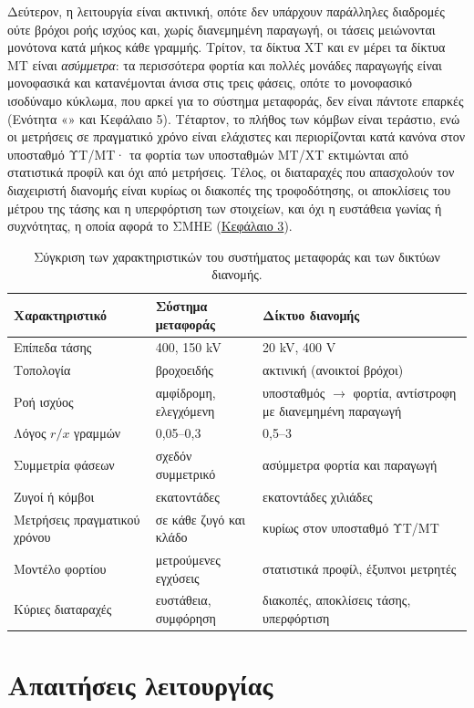 Δεύτερον, η λειτουργία είναι ακτινική, οπότε δεν υπάρχουν παράλληλες διαδρομές ούτε βρόχοι
ροής ισχύος και, χωρίς διανεμημένη παραγωγή, οι τάσεις μειώνονται μονότονα κατά μήκος κάθε
γραμμής. Τρίτον, τα δίκτυα ΧΤ και εν μέρει τα δίκτυα ΜΤ είναι \emph{ασύμμετρα}: τα
περισσότερα φορτία και πολλές μονάδες παραγωγής είναι μονοφασικά και κατανέμονται άνισα στις
τρεις φάσεις, οπότε το μονοφασικό ισοδύναμο κύκλωμα, που αρκεί για το σύστημα μεταφοράς, δεν
είναι πάντοτε επαρκές (Ενότητα «» και Κεφάλαιο 5).
Τέταρτον, το πλήθος των κόμβων είναι τεράστιο, ενώ οι μετρήσεις σε πραγματικό χρόνο είναι
ελάχιστες και περιορίζονται κατά κανόνα στον υποσταθμό ΥΤ/ΜΤ· τα φορτία των υποσταθμών
ΜΤ/ΧΤ εκτιμώνται από στατιστικά προφίλ και όχι από μετρήσεις. Τέλος, οι διαταραχές που
απασχολούν τον διαχειριστή διανομής είναι κυρίως οι διακοπές της τροφοδότησης, οι αποκλίσεις
του μέτρου της τάσης και η υπερφόρτιση των στοιχείων, και όχι η ευστάθεια γωνίας ή
συχνότητας, η οποία αφορά το ΣΜΗΕ (\hyperref[kef-03-theoria]{Κεφάλαιο 3}).

\begin{table}[!htbp]
\centering
\begin{tabular}{lll}
\hline
Χαρακτηριστικό & Σύστημα μεταφοράς & Δίκτυο διανομής \\
\hline
Επίπεδα τάσης & 400, 150 kV & 20 kV, 400 V \\
Τοπολογία & βροχοειδής & ακτινική (ανοικτοί βρόχοι) \\
Ροή ισχύος & αμφίδρομη, ελεγχόμενη & υποσταθμός $\rightarrow$ φορτία, αντίστροφη με διανεμημένη παραγωγή \\
Λόγος $r/x$ γραμμών & 0,05--0,3 & 0,5--3 \\
Συμμετρία φάσεων & σχεδόν συμμετρικό & ασύμμετρα φορτία και παραγωγή \\
Ζυγοί ή κόμβοι & εκατοντάδες & εκατοντάδες χιλιάδες \\
Μετρήσεις πραγματικού χρόνου & σε κάθε ζυγό και κλάδο & κυρίως στον υποσταθμό ΥΤ/ΜΤ \\
Μοντέλο φορτίου & μετρούμενες εγχύσεις & στατιστικά προφίλ, έξυπνοι μετρητές \\
Κύριες διαταραχές & ευστάθεια, συμφόρηση & διακοπές, αποκλίσεις τάσης, υπερφόρτιση \\
\hline
\end{tabular}
\caption{Σύγκριση των χαρακτηριστικών του συστήματος μεταφοράς και των δικτύων διανομής.}
\label{tab:dn-vs-tn}
\end{table}

\section{Απαιτήσεις λειτουργίας}
\label{sec:dn-requirements}

